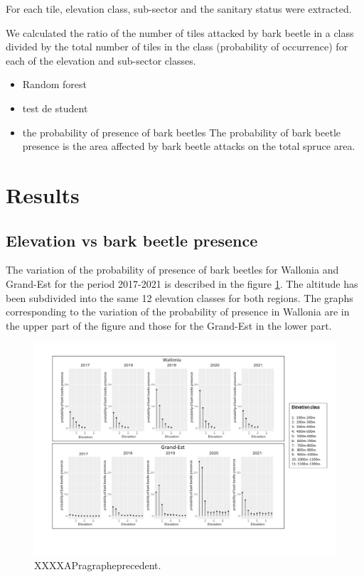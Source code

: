 \documentclass[3p,times]{elsarticle}
\begin{document}
For each tile, elevation class, sub-sector and the sanitary status were extracted.

We calculated the ratio of the number of tiles attacked by bark beetle in a class divided by the total number of tiles in the class (probability of occurrence) for each of the elevation and sub-sector classes.




\begin{itemize}
	\item Random forest  
	

	\item test de student
	\item the probability of presence of bark beetles
The probability of bark beetle presence is the area affected by bark beetle attacks on the total spruce area. 



\end{itemize}

\section{Results}

\subsection{ Elevation vs bark beetle presence}
The variation of the probability of presence of bark beetles for Wallonia and Grand-Est for the period 2017-2021 is described in the figure 
\ref{alti_sco}.
 The altitude has been subdivided into the same 12 elevation classes for both regions. The graphs corresponding to the variation of the probability of presence in Wallonia are in the upper part of the figure and those for the Grand-Est in the lower part.
\begin{landscape}
\begin{figure}
\centering
	\includegraphics[width=\textwidth]{graphe_wall_GDE.png}
     \caption{XXXXAPragrapheprecedent.}
	\label{alti_sco}
\end{figure}

 \end{landscape}
\end{document}
